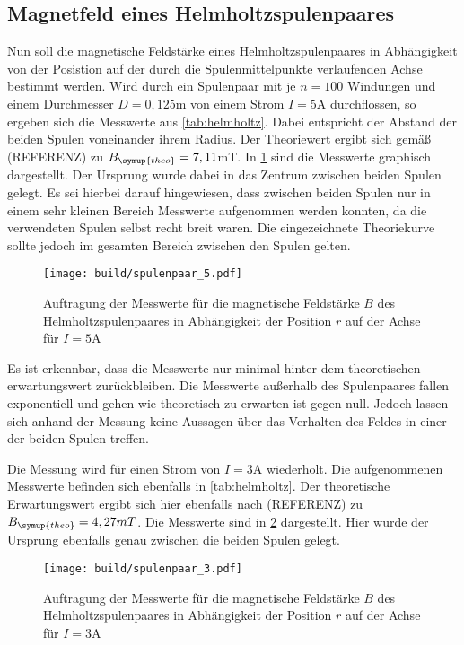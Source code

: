 \newpage
\subsection{Magnetfeld eines Helmholtzspulenpaares}

Nun soll die magnetische Feldstärke eines Helmholtzspulenpaares in Abhängigkeit von
der Posistion auf der durch die Spulenmittelpunkte verlaufenden Achse bestimmt werden.
Wird durch ein Spulenpaar mit je $n=100$ Windungen und einem Durchmesser $D=0,125$m
von einem Strom $I=5$A durchflossen, so ergeben sich die Messwerte aus \ref{tab:helmholtz}.
Dabei entspricht der Abstand der beiden Spulen voneinander ihrem Radius.
Der Theoriewert ergibt sich gemäß (REFERENZ) zu $B_{\symup{theo}}=7,11$mT. In
\ref{fig:spulenpaar_5} sind die Messwerte graphisch dargestellt. Der Ursprung wurde
dabei in das Zentrum zwischen beiden Spulen gelegt. Es sei hierbei darauf
hingewiesen, dass zwischen beiden Spulen nur in einem sehr kleinen Bereich Messwerte
aufgenommen werden konnten, da die verwendeten Spulen selbst recht breit waren. Die
eingezeichnete Theoriekurve sollte jedoch im gesamten Bereich zwischen den Spulen
gelten.

\begin{figure}
  \centering
  \texttt{[image: build/spulenpaar\_5.pdf]}
  \caption{Auftragung der Messwerte für die magnetische Feldstärke $B$ des Helmholtzspulenpaares
  in Abhängigkeit der Position $r$ auf der Achse für $I=5$A}
  \label{fig:spulenpaar_5}
\end{figure}

Es ist erkennbar, dass die Messwerte nur minimal hinter dem theoretischen erwartungswert
zurückbleiben. Die Messwerte außerhalb des Spulenpaares fallen exponentiell und gehen
wie theoretisch zu erwarten ist gegen null. Jedoch lassen sich anhand der Messung keine
Aussagen über das Verhalten des Feldes in einer der beiden Spulen treffen.


Die Messung wird für einen Strom von $I=3$A wiederholt. Die aufgenommenen Messwerte
befinden sich ebenfalls in \ref{tab:helmholtz}. Der theoretische Erwartungswert
ergibt sich hier ebenfalls nach (REFERENZ) zu $B_{\symup{theo}}=4,27mT$. Die Messwerte
sind in \ref{fig:spulenpaar_3} dargestellt. Hier wurde der Ursprung ebenfalls genau
zwischen die beiden Spulen gelegt.

\begin{figure}
  \centering
  \texttt{[image: build/spulenpaar\_3.pdf]}
  \caption{Auftragung der Messwerte für die magnetische Feldstärke $B$ des Helmholtzspulenpaares
  in Abhängigkeit der Position $r$ auf der Achse für $I=3$A}
  \label{fig:spulenpaar_3}
\end{figure}

